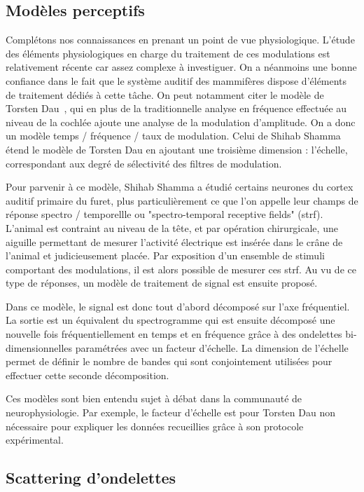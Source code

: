 \subsection{Modèles perceptifs}

Complétons nos connaissances en prenant un point de vue physiologique. L'étude des éléments physiologiques en charge du traitement de ces modulations est relativement récente car assez complexe à investiguer. On a néanmoins une bonne confiance dans le fait que le système auditif des mammifères dispose d'éléments de traitement dédiés à cette tâche. On peut notamment citer le modèle de Torsten Dau~\cite{dau1997modeling}, qui en plus de la traditionnelle analyse en fréquence effectuée au niveau de la cochlée ajoute une analyse de la modulation d'amplitude. On a donc un modèle temps / fréquence / taux de modulation. Celui de Shihab Shamma~\cite{fritz2003rapid} étend le modèle de Torsten Dau en ajoutant une troisième dimension : l'échelle, correspondant aux degré de sélectivité des filtres de modulation.

Pour parvenir à ce modèle, Shihab Shamma a étudié certains neurones du cortex auditif primaire du furet, plus particulièrement ce que l'on appelle leur champs de réponse spectro / temporellle ou "spectro-temporal receptive fields" (strf). L'animal est contraint au niveau de la tête, et par opération chirurgicale, une aiguille permettant de mesurer l'activité électrique est insérée dans le crâne de l'animal et judicieusement placée. Par exposition d'un ensemble de stimuli comportant des modulations, il est alors possible de mesurer ces strf. Au vu de ce type de réponses, un modèle de traitement de signal est ensuite proposé.

Dans ce modèle, le signal est donc tout d'abord décomposé sur l'axe fréquentiel. La sortie est un équivalent du spectrogramme qui est ensuite décomposé une nouvelle fois fréquentiellement en temps et en fréquence grâce à des ondelettes bi-dimensionnelles paramétrées avec un facteur d'échelle. La dimension de l'échelle permet de définir le nombre de bandes qui sont conjointement utilisées pour effectuer cette seconde décomposition.

Ces modèles sont bien entendu sujet à débat dans la communauté de neurophysiologie. Par exemple, le facteur d'échelle est pour Torsten Dau non nécessaire pour expliquer les données recueillies grâce à son protocole expérimental.

\subsection{\nmu Scattering d'ondelettes}  \label{sec:scattering}

